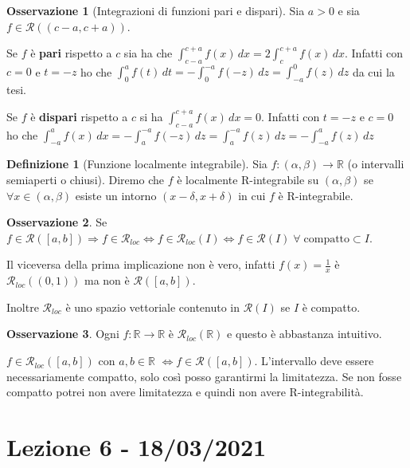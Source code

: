 \documentclass{article}
\theoremstyle{definition}
\theoremstyle{definition}
\theoremstyle{definition}
\newtheorem{definition}{Definizione}[section]
\theoremstyle{definition}
\newtheorem{remark}{Osservazione}[section]
\theoremstyle{definition}
\theoremstyle{definition}
\begin{document}
\begin{remark}[Integrazioni di funzioni pari e dispari]
    Sia $a>0$ e sia $f\in\mathcal{R}((c-a,c+a))$.

    Se $f$ è \textbf{pari} rispetto a $c$ sia ha che $\int_{c-a}^{c+a}f(x)\,dx=2\int_c^{c+a}f(x)\,dx$. Infatti con $c=0$ e $t=-z$ ho che $\int_0^af(t)\,dt=-\int_0^{-a}f(-z)\,dz=\int_{-a}^0f(z)\,dz$ da cui la tesi.

    Se $f$ è \textbf{dispari} rispetto a $c$ si ha $\int_{c-a}^{c+a}f(x)\,dx=0$. Infatti con $t=-z$ e $c=0$ ho che $\int_{-a}^{a}f(x)\,dx=-\int_a^{-a}f(-z)\,dz=\int_a^{-a}f(z)\,dz=-\int_{-a}^af(z)\,dz$
\end{remark}

\begin{definition}[Funzione localmente integrabile]
    Sia $f:(\alpha,\beta)\rightarrow \mathbb{R}$ (o intervalli semiaperti o chiusi). Diremo che $f$ è localmente R-integrabile su $(\alpha,\beta)$ se $\forall x \in (\alpha,\beta)$ esiste un intorno $(x-\delta,x+\delta)$ in cui $f$ è R-integrabile.
\end{definition}

\begin{remark}
    Se $f\in\mathcal{R}([a,b])\Rightarrow f\in\mathcal{R}_{loc} \Leftrightarrow f\in\mathcal{R}_{loc}(I) \Leftrightarrow f\in\mathcal{R}(I) \;\forall\; \text{compatto} \subset I$.

    Il viceversa della prima implicazione non è vero, infatti $f(x)=\frac{1}{x}$ è $\mathcal{R}_{loc}((0,1))$ ma non è $\mathcal{R}([a,b])$.

    Inoltre $\mathcal{R}_{loc}$ è uno spazio vettoriale contenuto in $\mathcal{R}(I)$ se $I$ è compatto.
\end{remark}

\begin{remark}
    Ogni $f:\mathbb{R}\rightarrow\mathbb{R}$ è $\mathcal{R}_{loc}(\mathbb{R})$ e questo è abbastanza intuitivo.

    $f\in\mathcal{R}_{loc}([a,b])$ con $a,b\in\mathbb{R}$ $\Leftrightarrow f\in\mathcal{R}([a,b])$. L'intervallo deve essere necessariamente compatto, solo così posso garantirmi la limitatezza. Se non fosse compatto potrei non avere limitatezza e quindi non avere R-integrabilità.
\end{remark}

\newpage
\section{Lezione 6 - 18/03/2021}
\end{document}
